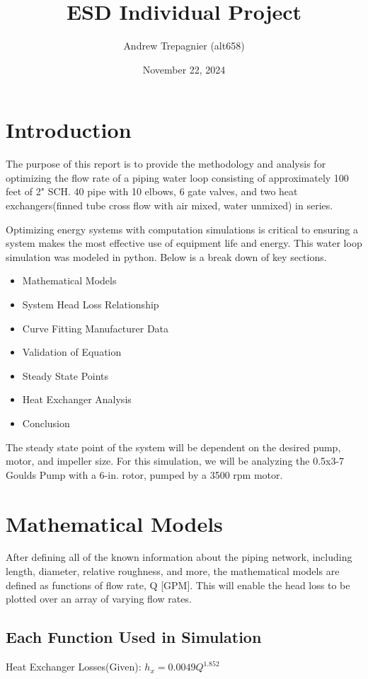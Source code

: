 \documentclass{article}
\title{ESD Individual Project}
\author{Andrew Trepagnier (alt658) }
\date{November 22, 2024}
\begin{document}
\maketitle

\section{Introduction}

The purpose of this report is to provide the methodology and analysis for optimizing the flow rate of a piping water loop consisting of approximately 100 feet of 2" SCH. 40 pipe with 10 elbows, 6 gate valves, and two heat exchangers(finned tube cross flow with air mixed, water unmixed) in series.

Optimizing energy systems with computation simulations is critical to ensuring a system makes the most effective use of equipment life and energy. This water loop simulation was modeled in python. Below is a break down of key sections.
\begin{itemize}
    \item Mathematical Models
    \item System Head Loss Relationship
    \item Curve Fitting Manufacturer Data
    \item Validation of Equation
    \item Steady State Points
    \item Heat Exchanger Analysis
    \item Conclusion
\end{itemize}


The steady state point of the system will be dependent on the desired pump, motor, and impeller size. For this simulation, we will be analyzing the 0.5x3-7 Goulds Pump with a 6-in. rotor, pumped by a 3500 rpm motor.


\section{Mathematical Models}

After defining all of the known information about the piping network, including length, diameter, relative roughness, and more, the mathematical models are defined as functions of flow rate, Q [GPM]. This will enable the head loss to be plotted over an array of varying flow rates. 

\subsection{Each Function Used in Simulation}
Heat Exchanger Losses(Given):
$h_{x} = 0.0049Q^{1.852}$
\end{document}
